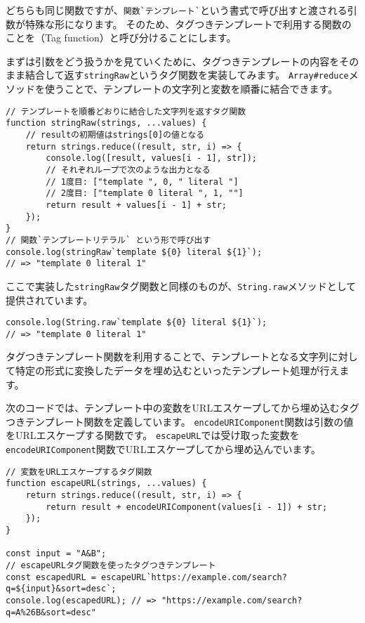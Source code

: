どちらも同じ関数ですが、\texttt{関数}\lstinline{`}\texttt{テンプレート}\lstinline{`}という書式で呼び出すと渡される引数が特殊な形になります。
そのため、タグつきテンプレートで利用する関数のことを\textbf{}（Tag
function）と呼び分けることにします。

まずは引数をどう扱うかを見ていくために、タグつきテンプレートの内容をそのまま結合して返す\texttt{stringRaw}というタグ関数を実装してみます。
\texttt{Array\#reduce}メソッドを使うことで、テンプレートの文字列と変数を順番に結合できます。

\begin{lstlisting}
// テンプレートを順番どおりに結合した文字列を返すタグ関数
function stringRaw(strings, ...values) {
    // resultの初期値はstrings[0]の値となる
    return strings.reduce((result, str, i) => {
        console.log([result, values[i - 1], str]);
        // それぞれループで次のような出力となる
        // 1度目: ["template ", 0, " literal "]
        // 2度目: ["template 0 literal ", 1, ""]
        return result + values[i - 1] + str;
    }); 
}
// 関数`テンプレートリテラル` という形で呼び出す
console.log(stringRaw`template ${0} literal ${1}`); 
// => "template 0 literal 1"
\end{lstlisting}

ここで実装した\texttt{stringRaw}タグ関数と同様のものが、\texttt{String.raw}メソッド\protect{}として提供されています。

\begin{lstlisting}
console.log(String.raw`template ${0} literal ${1}`); 
// => "template 0 literal 1"
\end{lstlisting}

タグつきテンプレート関数を利用することで、テンプレートとなる文字列に対して特定の形式に変換したデータを埋め込むといったテンプレート処理が行えます。

次のコードでは、テンプレート中の変数をURLエスケープしてから埋め込むタグつきテンプレート関数を定義しています。
\texttt{encodeURIComponent}関数は引数の値をURLエスケープする関数です。
\texttt{escapeURL}では受け取った変数を\texttt{encodeURIComponent}関数でURLエスケープしてから埋め込んでいます。

\begin{lstlisting}
// 変数をURLエスケープするタグ関数
function escapeURL(strings, ...values) {
    return strings.reduce((result, str, i) => {
        return result + encodeURIComponent(values[i - 1]) + str;
    });  
}

const input = "A&B";
// escapeURLタグ関数を使ったタグつきテンプレート
const escapedURL = escapeURL`https://example.com/search?q=${input}&sort=desc`;
console.log(escapedURL); // => "https://example.com/search?q=A%26B&sort=desc"
\end{lstlisting}

